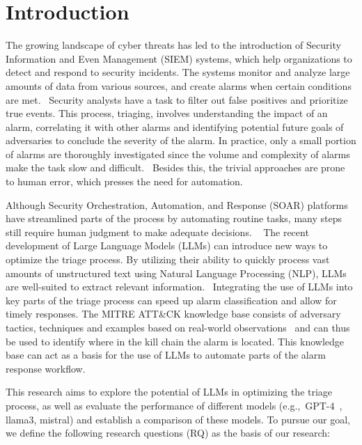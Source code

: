 \section{Introduction}
\label{sec:introduction}

The growing landscape of cyber threats has led to the introduction of Security Information and Even Management (SIEM)
systems, which help organizations to detect and respond to security incidents.
The systems monitor and analyze large amounts of data from various sources, and create alarms when certain conditions
are met.\ \citep{ibmsiem}
Security analysts have a task to filter out false positives and prioritize true events.
This process, triaging, involves understanding the impact of an alarm, correlating it with other alarms and identifying
potential future goals of adversaries to conclude the severity of the alarm.
In practice, only a small portion of alarms are thoroughly investigated since the volume and complexity of alarms make
the task slow and difficult.\ \citep{chen2024elevating}
Besides this, the trivial approaches are prone to human error, which presses the need for automation.

Although Security Orchestration, Automation, and Response (SOAR) platforms have streamlined parts of the process by
automating routine tasks, many steps still require human judgment to make adequate decisions.
\ \citep{chuvakin2019triaging}
The recent development of Large Language Models (LLMs) can introduce new ways to optimize the triage process.
By utilizing their ability to quickly process vast amounts of unstructured text using Natural Language Processing (NLP),
LLMs are well-suited to extract relevant information.\ \citep{chaudhary2024ai}
Integrating the use of LLMs into key parts of the triage process can speed up alarm classification and allow for timely
responses.
The MITRE ATT\&CK knowledge base consists of adversary tactics, techniques and examples based on real-world
observations\ \citep{strom2018mitre} and can thus be used to identify where in the kill chain the alarm is located.
This knowledge base can act as a basis for the use of LLMs to automate parts of the alarm response workflow.

This research aims to explore the potential of LLMs in optimizing the triage process, as well as evaluate the
performance of different models (e.g.,\ GPT-4\ \citep{achiam2023gpt}, llama3, mistral) and establish a comparison of
these models.
To pursue our goal, we define the following research questions (RQ) as the basis of our research:

